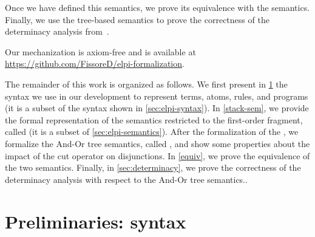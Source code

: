 Once we have defined this semantics, we prove its equivalence with the
\elpi semantics. Finally, we use the tree-based semantics to prove the
correctness of the determinacy analysis from~\cite{fissore2026}.

Our mechanization is axiom-free and is available at
\url{https://github.com/FissoreD/elpi-formalization}.

The remainder of this work is organized as follows. We first present in
\cref{sec:preliminaries} the syntax we use in our \rocq development to represent
terms, atoms, rules, and programs (it is a subset of the syntax shown in
\cref{sec:elpi-syntax}). In \cref{stack-sem}, we provide the formal
representation of the \elpi semantics restricted to the first-order fragment,
called \runS (it is a subset of \cref{sec:elpi-semantics}). After the
formalization of the \runS, we formalize the And-Or tree semantics, called
\runT, and show some properties about the impact of the cut operator on
disjunctions. In \cref{equiv}, we prove the equivalence of the two semantics.
Finally, in \cref{sec:determinacy}, we prove the correctness of the determinacy
analysis with respect to the And-Or tree semantics..


\section{Preliminaries: syntax}
\label{sec:preliminaries}

